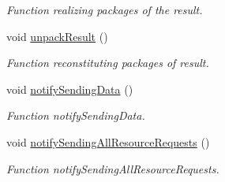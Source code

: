 \begin{CompactItemize}
\begin{CompactList}\small\item\em Function realizing packages of the result. \item\end{CompactList}\item 
\hypertarget{classpeoTransform_e0244425e846c5679c901b61e4252814}{
void \hyperlink{classpeoTransform_e0244425e846c5679c901b61e4252814}{unpack\-Result} ()}
\label{classpeoTransform_e0244425e846c5679c901b61e4252814}

\begin{CompactList}\small\item\em Function reconstituting packages of result. \item\end{CompactList}\item 
\hypertarget{classpeoTransform_77508f186476181ec2c6a8230961eede}{
void \hyperlink{classpeoTransform_77508f186476181ec2c6a8230961eede}{notify\-Sending\-Data} ()}
\label{classpeoTransform_77508f186476181ec2c6a8230961eede}

\begin{CompactList}\small\item\em Function notify\-Sending\-Data. \item\end{CompactList}\item 
\hypertarget{classpeoTransform_19990af963b6604d1175290fe6725335}{
void \hyperlink{classpeoTransform_19990af963b6604d1175290fe6725335}{notify\-Sending\-All\-Resource\-Requests} ()}
\label{classpeoTransform_19990af963b6604d1175290fe6725335}

\begin{CompactList}\small\item\em Function notify\-Sending\-All\-Resource\-Requests. \item\end{CompactList}\end{CompactItemize}
